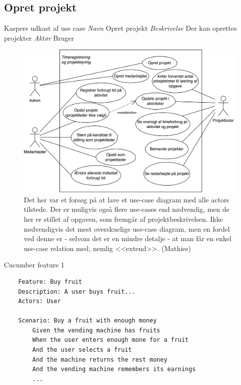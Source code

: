 \subsection{Opret projekt}
\Large{Kaspers udkast af use case}\newline
\normalsize
\emph{Navn}\newline
Opret projekt\newline
\emph{Beskrivelse}\newline
Der kan oprettes projekter\newline
\emph{Aktør}\newline
Bruger
\begin{figure}[H]
    \centering
    \caption{Det her var et forsøg på at lave et use-case diagram med alle actors tilstede. Der er muligvis også flere use-cases end nødvendig, men de her er stillet af opgaven, som fremgår af projektbeskrivelsen. Ikke nødvendigvis det mest overskuelige use-case diagram, men en fordel ved denne er - selvom det er en mindre detalje - at man får en enkel use-case relation med, nemlig <<extend>>. (Mathies)}\label{fig:AlleActorsPaaEnGang}
    \includegraphics[width=.7\textwidth]{Diagrams/Timeregistrering og projektstyring.png}
\end{figure}



\begin{listing}[H]
    \centering
    \caption{Cucumber feature 1}\label{lst:feature1}
    \begin{verbatim}
    Feature: Buy fruit
    Description: A user buys fruit...
    Actors: User
    
    Scenario: Buy a fruit with enough money
        Given the vending machine has fruits
        When the user enters enough mone for a fruit
        And the user selects a fruit
        And the machine returns the rest money
        And the vending machine remembers its earnings
        ...
    \end{verbatim}
\end{listing}